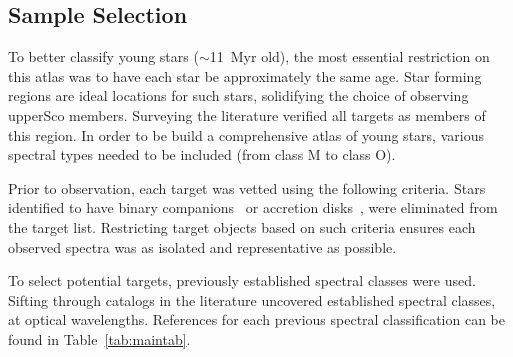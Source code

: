 \subsection{Sample Selection}


To better classify young stars ($\sim$11~Myr old), 
the most essential restriction on this atlas was to 
have each star be approximately the same age. 
Star forming regions are ideal locations for such stars, 
solidifying the choice of observing upperSco members.  
Surveying the literature verified all targets as members of this 
region.  In order to be build a comprehensive atlas of young 
stars, various spectral types needed to be included 
(from class M to class O).




Prior to observation, each target was vetted using the following criteria. 
Stars identified to have binary companions~\cite{binary_guy} or accretion 
disks~\cite{binary_guy}, were eliminated from the target list.  
Restricting target objects based on such criteria ensures each observed 
spectra was as isolated and representative as possible.



To select potential targets, previously established spectral classes 
were used.  
Sifting through catalogs in the literature uncovered established 
spectral classes, at optical wavelengths.    
References for each previous spectral classification 
can be found in Table~\ref{tab:maintab}.\\












